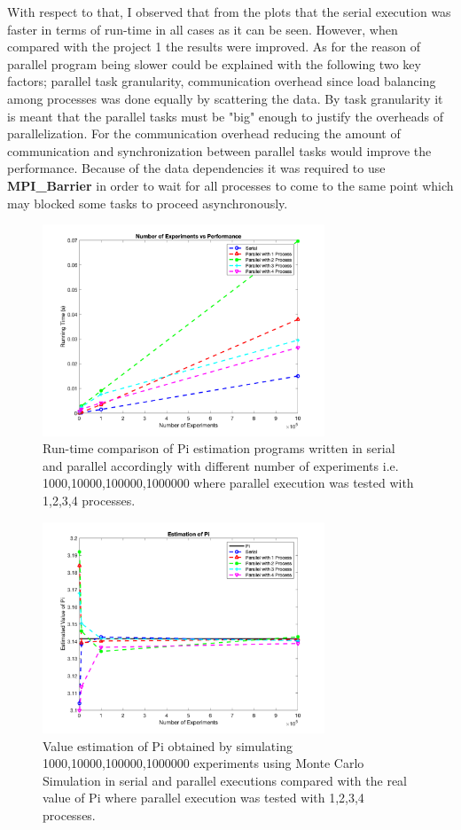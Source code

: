 \documentclass[a4paper,11pt]{article}
\theoremstyle{mytheor}
\begin{document}
With respect to that, I observed that from the plots that the serial execution was faster in terms of run-time in all cases as it can be seen. However, when compared with the project 1 the results were improved. As for the reason of parallel program being slower could be explained with the following two key factors; parallel task granularity, communication overhead since load balancing among processes was done equally by scattering the data. By task granularity it is meant that the parallel tasks must be "big" enough to justify the overheads of parallelization. For the communication overhead reducing the amount of communication and synchronization between parallel tasks would improve the performance. Because of the data dependencies it was required to use \textbf{MPI\_Barrier} in order to wait for all processes to come to the same point which may blocked some tasks to proceed asynchronously.

\begin{figure}[!htb]
    \centering
    \includegraphics[width=0.75\textwidth]{figure1}
    \caption{Run-time comparison of Pi estimation programs written in serial and parallel accordingly with different number of experiments i.e.  1000,10000,100000,1000000 where parallel execution was tested with 1,2,3,4 processes.}
\end{figure}

\begin{figure}[!htb]
    \centering
    \includegraphics[width=0.75\textwidth]{figure2}
    \caption{Value estimation of Pi obtained by simulating 1000,10000,100000,1000000 experiments using Monte Carlo Simulation in serial and parallel executions compared with the real value of Pi where parallel execution was tested with 1,2,3,4 processes.}
\end{figure}
\end{document}

